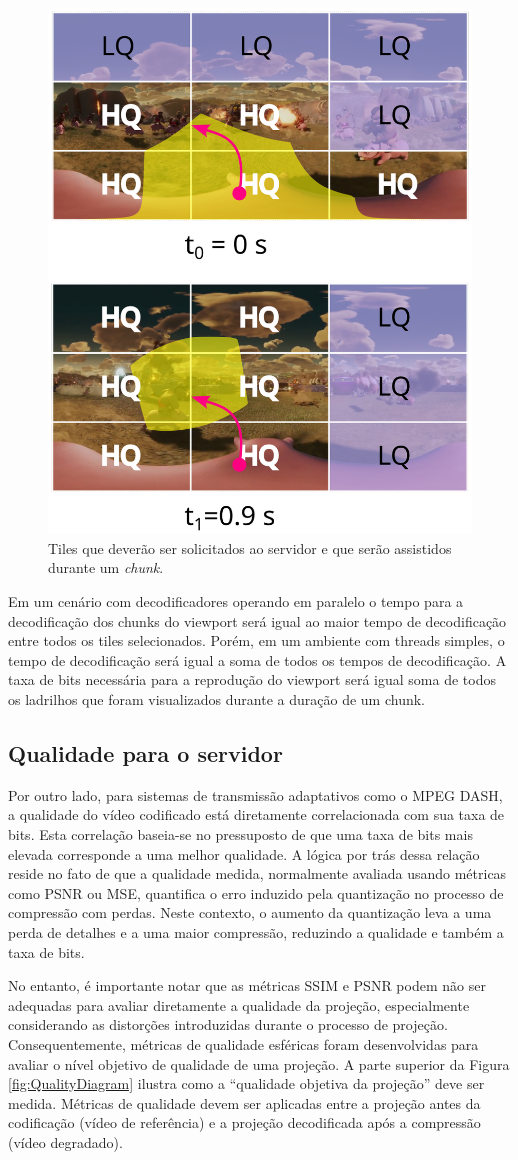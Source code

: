 \begin{figure}[h]
    \centering
    \includegraphics[width=0.5\linewidth]{fig/Streaming of Tiles 2.png}
    \caption{Tiles que deverão ser solicitados ao servidor e que serão assistidos durante um \textit{chunk}.}
    \label{fig:selectTiles}
\end{figure}

Em um cenário com decodificadores operando em paralelo o tempo para a decodificação dos chunks do viewport será igual ao maior tempo de decodificação entre todos os tiles selecionados. Porém, em um ambiente com threads simples, o tempo de decodificação será igual a soma de todos os tempos de decodificação. A taxa de bits necessária para a reprodução do viewport será igual soma de todos os ladrilhos que foram visualizados durante a duração de um chunk.

\subsection{Qualidade para o servidor}

Por outro lado, para sistemas de transmissão adaptativos como o MPEG DASH, a qualidade do vídeo codificado está diretamente correlacionada com sua taxa de bits. Esta correlação baseia-se no pressuposto de que uma taxa de bits mais elevada corresponde a uma melhor qualidade. A lógica por trás dessa relação reside no fato de que a qualidade medida, normalmente avaliada usando métricas como PSNR ou MSE, quantifica o erro induzido pela quantização no processo de compressão com perdas. Neste contexto, o aumento da quantização leva a uma perda de detalhes e a uma maior compressão, reduzindo a qualidade e também a taxa de bits.

No entanto, é importante notar que as métricas SSIM e PSNR podem não ser adequadas para avaliar diretamente a qualidade da projeção, especialmente considerando as distorções introduzidas durante o processo de projeção. Consequentemente, métricas de qualidade esféricas foram desenvolvidas para avaliar o nível objetivo de qualidade de uma projeção. A parte superior da Figura \ref{fig:QualityDiagram} ilustra como a “qualidade objetiva da projeção” deve ser medida. Métricas de qualidade devem ser aplicadas entre a projeção antes da codificação (vídeo de referência) e a projeção decodificada após a compressão (vídeo degradado).

